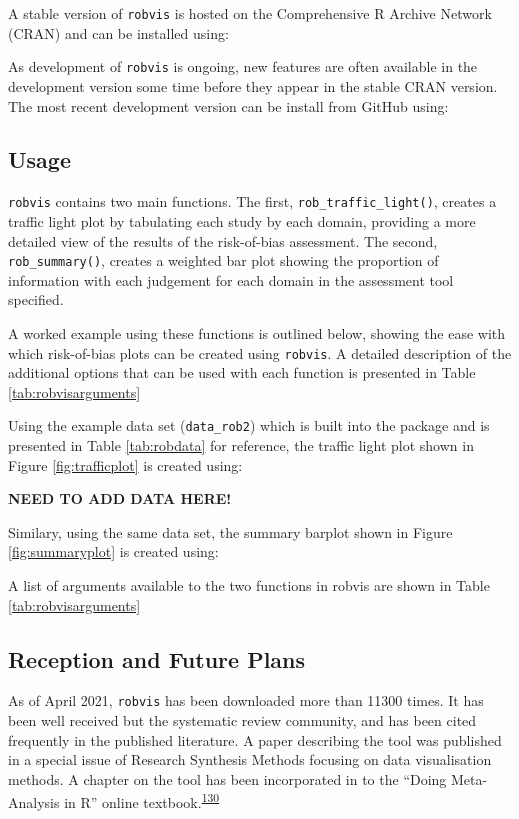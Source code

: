 \documentclass[a4paper, twoside]{templates/ociamthesis}
\begin{document}
A stable version of \texttt{robvis} is hosted on the Comprehensive R Archive Network (CRAN) and can be installed using:

As development of \texttt{robvis} is ongoing, new features are often available in the development version some time before they appear in the stable CRAN version. The most recent development version can be install from GitHub using:

\hypertarget{usage-1}{%
\subsection{Usage}\label{usage-1}}

\texttt{robvis} contains two main functions. The first, \texttt{rob\_traffic\_light()}, creates a traffic light plot by tabulating each study by each domain, providing a more detailed view of the results of the risk-of-bias assessment. The second, \texttt{rob\_summary()}, creates a weighted bar plot showing the proportion of information with each judgement for each domain in the assessment tool specified.

A worked example using these functions is outlined below, showing the ease with which risk-of-bias plots can be created using \texttt{robvis}. A detailed description of the additional options that can be used with each function is presented in Table \ref{tab:robvisarguments}

Using the example data set (\texttt{data\_rob2}) which is built into the package and is presented in Table \ref{tab:robdata} for reference, the traffic light plot shown in Figure \ref{fig:trafficplot} is created using:

\textbf{NEED TO ADD DATA HERE!}

Similary, using the same data set, the summary barplot shown in Figure \ref{fig:summaryplot} is created using:

A list of arguments available to the two functions in robvis are shown in Table \ref{tab:robvisarguments}

\hypertarget{reception-and-future-plans-1}{%
\subsection{Reception and Future Plans}\label{reception-and-future-plans-1}}

As of April 2021, \texttt{robvis} has been downloaded more than 11300 times. It has been well received but the systematic review community, and has been cited frequently in the published literature. A paper describing the tool was published in a special issue of Research Synthesis Methods focusing on data visualisation methods. A chapter on the tool has been incorporated in to the ``Doing Meta-Analysis in R'' online textbook.\textsuperscript{\protect\hyperlink{ref-mathias_harrer_2019_2551803}{130}}
\end{document}
